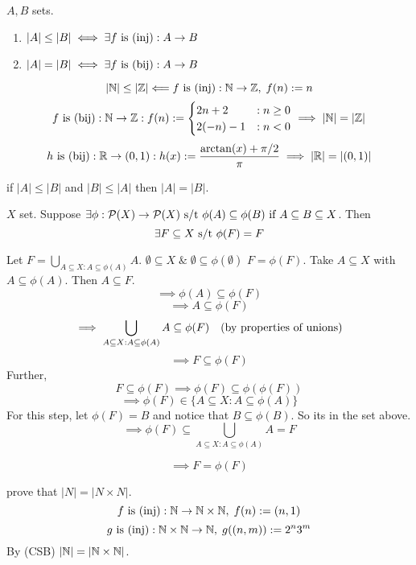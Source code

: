 \documentclass[12pt]{article}
\begin{document}
\bbox
\begin{defn}
  \(A,B\) sets.
  \begin{enumerate}
    \item \(|A|\le|B|\iff\exists f\ \mathrm{is}\ (\mathrm{inj}):A\to B\)
    \item \(|A|=|B|\iff\exists f\ \mathrm{is}\ (\mathrm{bij}):A\to B\)
  \end{enumerate}
\end{defn}
\ebox
\bboxex
\[|\mathbb N|\le|\mathbb Z|\Longleftarrow f\ \mathrm{is}\ (\mathrm{inj}):\mathbb N\to\mathbb Z,\;f(n):=n\]
\begin{equation*}
  f\ \mathrm{is}\ (\mathrm{bij}):\mathbb N\to\mathbb Z:f(n):=
  \begin{cases}
    2n+2&:n\ge0\\
    2(-n)-1&:n<0
  \end{cases}\implies|\mathbb N|=|\mathbb Z|
\end{equation*}
\[h\ \mathrm{is}\ (\mathrm{bij}):\mathbb R\to(0,1):h(x):=\frac{\mathrm{arctan}(x)+\pi/2}\pi\implies|\mathbb R|=|(0,1)|\]
\ebox

\bbox
\begin{thm} \label{thm:CSB}
  if \(|A|\le|B|\) and \(|B|\le|A|\) then \(|A|=|B|\).
\end{thm}
\ebox


\bbox
\begin{lem}\label{lem:phi_fixed_pt}
  \(X\) set. Suppose \(\exists\phi:\mathcal P(X)\to\mathcal P(X)\text{ s/t }\phi(A)\subseteq\phi(B)
  \text{ if }A\subseteq B\subseteq X\). Then
  \[\exists F\subseteq X\text{ s/t }\phi(F)=F\]
\end{lem}
\ebox

\bboxproof
Let \(F=\bigcup_{A\subseteq X:A\subseteq\phi(A)}A\).
\bboxnote
{} \(\emptyset\subseteq X\;\&\;\emptyset\subseteq\phi(\emptyset)\)
\ebox
{} \(F=\phi(F)\).
Take \(A\subseteq X\) with \(A\subseteq\phi(A)\). Then \(A\subseteq F\).
\[\implies\phi(A)\subseteq\phi(F)\]
\[\implies A\subseteq\phi(F)\]
\[\implies\bigcup_{A\subseteq X:A\subseteq\phi(A)}A\subseteq\phi(F)\quad
\text{(by properties of unions)}\]
\[\implies F\subseteq\phi(F)\]
Further,
\[F\subseteq \phi(F)\implies\phi(F)\subseteq\phi(\phi(F))\]
\[\implies\phi(F)\in\{A\subseteq X:A\subseteq\phi(A)\}\]
For this step, let \(\phi(F)=B\) and notice that \(B\subseteq\phi(B)\). So
its in the set above.
\[\implies\phi(F)\subseteq\bigcup_{A\subseteq X:A\subseteq\phi(A)}A=F\]

\[\implies F=\phi(F)\]
\ebox

\bboxex
{} prove that \(|N|=|N\times N|\).
\[f\ \mathrm{is}\ (\mathrm{inj}):\mathbb N\to\mathbb N\times\mathbb N,\;f(n):=(n,1)\]
\[g\ \mathrm{is}\ (\mathrm{inj}):\mathbb N\times\mathbb N\to\mathbb N,\;g((n,m)):=2^n3^m\]
By (CSB) \(|\mathbb N|=|\mathbb N\times\mathbb N|\).
\ebox
\end{document}
